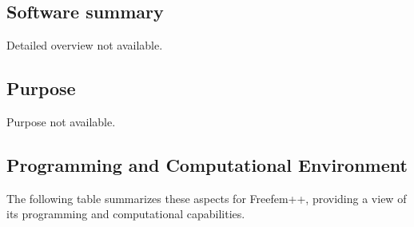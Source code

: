 \subsection{Software summary}
\label{sec:Freefem++:summary}
Detailed overview not available.



\subsection{Purpose}
\label{sec:Freefem++:purpose}
Purpose not available.

\subsection{Programming and Computational Environment}
\label{sec::Freefem++:environment_capabilities}


The following table summarizes these aspects for Freefem++, providing a  view of its programming and computational capabilities.

